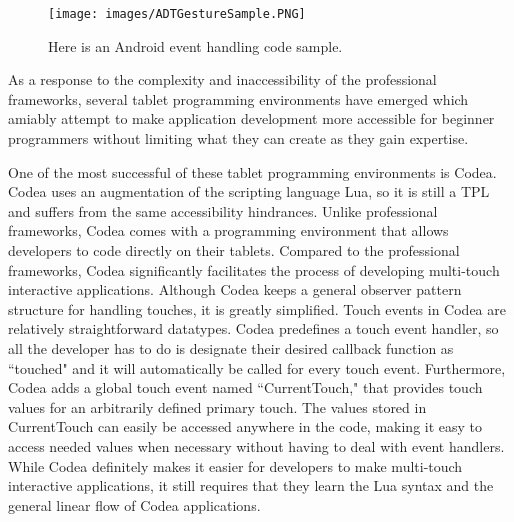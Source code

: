\begin{figure}
\centering
\texttt{[image: images/ADTGestureSample.PNG]}
\caption[Android Event Handling Code Sample]
{Here is an Android event handling code sample.}
\label{ADTGestureSample}
\end{figure}

As a response to the complexity and inaccessibility of the professional frameworks, several tablet programming environments have emerged which amiably attempt to make application development more accessible for beginner programmers without limiting what they can create as they gain expertise. 

One of the most successful of these tablet programming environments is Codea\cite{Codea}. Codea uses an augmentation of the scripting language Lua, so it is still a TPL and suffers from the same accessibility hindrances. Unlike professional frameworks, Codea comes with a programming environment that allows developers to code directly on their tablets. Compared to the professional frameworks, Codea significantly facilitates the process of developing multi-touch interactive applications. Although Codea keeps a general observer pattern structure for handling touches, it is greatly simplified. Touch events in Codea are relatively straightforward datatypes. Codea predefines a touch event handler, so all the developer has to do is designate their desired callback function as ``touched" and it will automatically be called for every touch event. Furthermore, Codea adds a global touch event named ``CurrentTouch," that provides touch values for an arbitrarily defined primary touch. The values stored in CurrentTouch can easily be accessed anywhere in the code, making it easy to access needed values when necessary without having to deal with event handlers. While Codea definitely makes it easier for developers to make multi-touch interactive applications, it still requires that they learn the Lua syntax and the general linear flow of Codea applications. 

